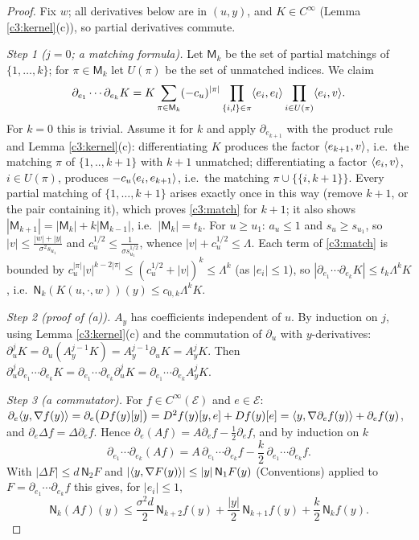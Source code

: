 \begin{proof}
Fix $w$; all derivatives below are in $(u,y)$, and $K\in C^\infty$ (Lemma \ref{c3:kernel}(c)), so partial derivatives commute.

\emph{Step 1 ($j=0$; a matching formula).} Let $\mathsf M_k$ be the set of partial matchings of $\{1,\dots,k\}$; for $\pi\in\mathsf M_k$ let $U(\pi)$ be the set of unmatched indices. We claim
\begin{equation}\label{c3:match}
\partial_{e_1}\cdots\partial_{e_k}K=K\sum_{\pi\in\mathsf M_k}(-c_u)^{|\pi|}\prod_{\{i,l\}\in\pi}\langle e_i,e_l\rangle\prod_{i\in U(\pi)}\langle e_i,v\rangle .
\end{equation}
For $k=0$ this is trivial. Assume it for $k$ and apply $\partial_{e_{k+1}}$ with the product rule and Lemma \ref{c3:kernel}(c): differentiating $K$ produces the factor $\langle e_{k+1},v\rangle$, i.e.\ the matching $\pi$ of $\{1,..,k+1\}$ with $k+1$ unmatched; differentiating a factor $\langle e_i,v\rangle$, $i\in U(\pi)$, produces $-c_u\langle e_i,e_{k+1}\rangle$, i.e.\ the matching $\pi\cup\{\{i,k+1\}\}$. Every partial matching of $\{1,\dots,k+1\}$ arises exactly once in this way (remove $k+1$, or the pair containing it), which proves \eqref{c3:match} for $k+1$; it also shows $|\mathsf M_{k+1}|=|\mathsf M_k|+k|\mathsf M_{k-1}|$, i.e.\ $|\mathsf M_k|=t_k$.
For $u\ge u_1$: $a_u\le1$ and $s_u\ge s_{u_1}$, so $|v|\le\frac{|w|+|y|}{\sigma^2s_{u_1}}$ and $c_u^{1/2}\le\frac1{\sigma s_{u_1}^{1/2}}$, whence $|v|+c_u^{1/2}\le\Lambda$. Each term of \eqref{c3:match} is bounded by $c_u^{|\pi|}|v|^{k-2|\pi|}\le(c_u^{1/2}+|v|)^k\le\Lambda^k$ (as $|e_i|\le1$), so $|\partial_{e_1}\cdots\partial_{e_k}K|\le t_k\Lambda^kK$, i.e.\ $\mathsf N_k(K(u,\cdot,w))(y)\le c_{0,k}\Lambda^kK$.

\emph{Step 2 (proof of (a)).} $A_y$ has coefficients independent of $u$. By induction on $j$, using Lemma \ref{c3:kernel}(c) and the commutation of $\partial_u$ with $y$-derivatives: $\partial_u^jK=\partial_u(A_y^{j-1}K)=A_y^{j-1}\partial_uK=A_y^jK$. Then $\partial_u^j\partial_{e_1}\cdots\partial_{e_k}K=\partial_{e_1}\cdots\partial_{e_k}\partial_u^jK=\partial_{e_1}\cdots\partial_{e_k}A_y^jK$.

\emph{Step 3 (a commutator).} For $f\in C^\infty(\mathcal E)$ and $e\in\mathcal E$: $\partial_e\langle y,\nabla f(y)\rangle=\partial_e\big(Df(y)[y]\big)=D^2f(y)[y,e]+Df(y)[e]=\langle y,\nabla\partial_ef(y)\rangle+\partial_ef(y)$, and $\partial_e\Delta f=\Delta\partial_ef$. Hence $\partial_e(Af)=A\partial_ef-\frac12\partial_ef$, and by induction on $k$
\[
\partial_{e_1}\cdots\partial_{e_k}(Af)=A\,\partial_{e_1}\cdots\partial_{e_k}f-\frac k2\,\partial_{e_1}\cdots\partial_{e_k}f .
\]
With $|\Delta F|\le d\,\mathsf N_2F$ and $|\langle y,\nabla F(y)\rangle|\le|y|\,\mathsf N_1F(y)$ (Conventions) applied to $F=\partial_{e_1}\cdots\partial_{e_k}f$ this gives, for $|e_i|\le1$,
\begin{equation}\label{c3:NA}
\mathsf N_k(Af)(y)\le\frac{\sigma^2d}2\,\mathsf N_{k+2}f(y)+\frac{|y|}2\,\mathsf N_{k+1}f(y)+\frac k2\,\mathsf N_kf(y).
\end{equation}


\end{proof}
